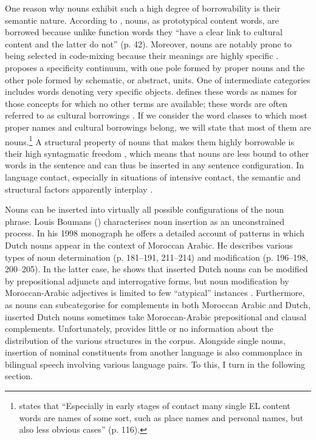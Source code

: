 One reason why nouns exhibit such a high degree of borrowability is their semantic nature. According to \citet{van-hout-muysken}, nouns, as prototypical content words, are borrowed because unlike function words they ``have a clear link to cultural content and the latter do not'' (p. 42). Moreover, nouns are notably prone to being selected in code-mixing because their meanings are highly specific \citep{backus-two-1996,backus-2001,field-2002}. \citet[115--131]{backus-two-1996} proposes a specificity continuum, with one pole formed by proper nouns and the other pole formed by schematic, or abstract, units. One of intermediate categories includes words denoting very specific objects. \citet[116]{backus-two-1996} defines these words as names for those concepts for which no other terms are available; these words are often referred to as cultural borrowings \citep[cf.][165]{myers-scotton-duelling-1993}. If we consider the word classes to which most proper names and cultural borrowings belong, we will state that most of them are nouns.\footnote{\citet{backus-two-1996} states that ``Especially in early stages of contact many single EL content words are names of some sort, such as place names and personal names, but also less obvious cases'' (p. 116).} A structural property of nouns that makes them highly borrowable is their high syntagmatic freedom \citep{backus-13}, which means that nouns are less bound to other words in the sentence and can thus be inserted in any sentence configuration. In language contact, especially in situations of intensive contact, the semantic and structural factors apparently interplay \citep[cf.][]{van-hout-muysken}.

Nouns can be inserted into virtually all possible configurations of the noun phrase. Louis Boumans (\citeyear[221]{boumans-syntax-1998}) characterises noun insertion as an unconstrained process. In his 1998 monograph \textit{} he offers a detailed account of patterns in which Dutch nouns appear in the context of Moroccan Arabic. He describes various types of noun determination (p. 181--191, 211--214) and modification (p. 196--198, 200--205). In the latter case, he shows that inserted Dutch nouns can be modified by prepositional adjuncts and interrogative forms, but noun modification by Moroccan-Arabic adjectives is limited to few ``atypical'' instances \citep[200--201]{boumans-syntax-1998}. Furthermore, as nouns can subcategorise for complements in both Moroccan Arabic and Dutch, inserted Dutch nouns sometimes take Moroccan-Arabic prepositional and clausal complements. Unfortunately, \citet{boumans-syntax-1998} provides little or no information about the distribution of the various structures in the corpus.
Alongside single nouns, insertion of nominal constituents from another language is also commonplace in bilingual speech involving various language pairs. To this, I turn in the following section.

